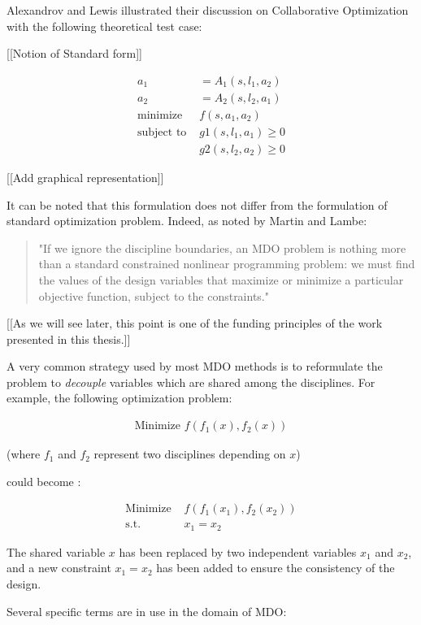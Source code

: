 Alexandrov and Lewis illustrated their discussion on Collaborative Optimization\cite{NataliaM.:2000:ACA:886733} with the following theoretical test case:

[[Notion of Standard form]]

\begin{align*}
a_1 &= A_1(s, l_1, a_2) \\
a_2 &= A_2(s, l_2, a_1) \\
\text{minimize } &f(s, a_1, a_2) \\
\text{subject to } &g1(s, l_1, a_1) \geq 0 \\
								&g2(s, l_2, a_2) \geq 0
\end{align*}

[[Add graphical representation]]

It can be noted that this formulation does not differ from the formulation of standard optimization problem. Indeed, as noted by Martin and Lambe\cite{Lambe:2011:A}:
 \begin{quote}
 "If we ignore the discipline boundaries, an MDO problem is nothing more than a standard constrained nonlinear programming problem: we must find the values of the design variables that maximize or minimize a particular objective function, subject to the constraints."
\end{quote}
[[As we will see later, this point is one of the funding principles of the work presented in this thesis.]]

A very common strategy used by most MDO methods is to reformulate the problem to \emph{decouple} variables which are shared among the disciplines. 
For example, the following optimization problem:

\begin{align*}
\text{Minimize } f(f_1(x), f_2(x))
\end{align*}

(where $f_1$ and $f_2$ represent two disciplines depending on $x$)

could become :

\begin{align*}
\text{Minimize } &f(f_1(x_1), f_2(x_2))\\
\text{s.t. } &x_1=x_2
\end{align*}

The shared variable $x$ has been replaced by two independent variables $x_1$ and $x_2$, and a new constraint $x_1=x_2$ has been added to ensure the consistency of the design.


Several specific terms are in use in the domain of MDO:

